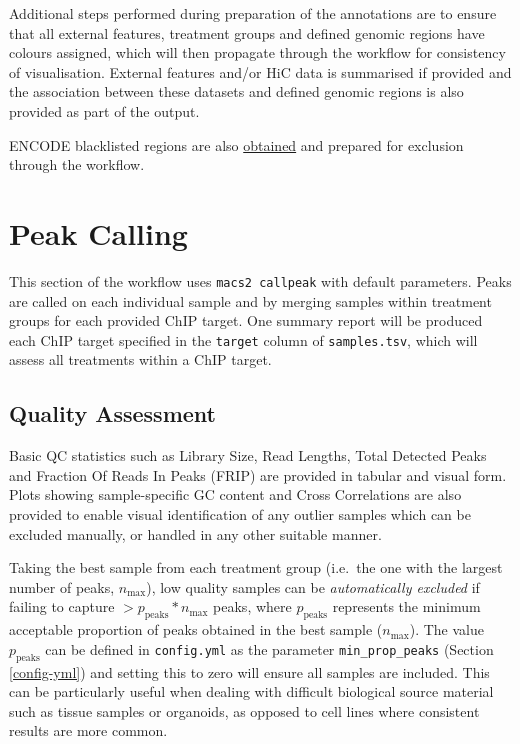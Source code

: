 \documentclass[
]{book}
\begin{document}
Additional steps performed during preparation of the annotations are to ensure that all external features, treatment groups and defined genomic regions have colours assigned, which will then propagate through the workflow for consistency of visualisation.
External features and/or HiC data is summarised if provided and the association between these datasets and defined genomic regions is also provided as part of the output.

ENCODE blacklisted regions are also \href{https://github.com/Boyle-Lab/Blacklist}{obtained} and prepared for exclusion through the workflow.

\hypertarget{peak-calling}{%
\section{Peak Calling}\label{peak-calling}}

This section of the workflow uses \texttt{macs2\ callpeak}\citep{macs2} with default parameters.
Peaks are called on each individual sample and by merging samples within treatment groups for each provided ChIP target.
One summary report will be produced each ChIP target specified in the \texttt{target} column of \texttt{samples.tsv}, which will assess all treatments within a ChIP target.

\hypertarget{quality-assessment}{%
\subsection*{Quality Assessment}\label{quality-assessment}}

Basic QC statistics such as Library Size, Read Lengths, Total Detected Peaks and Fraction Of Reads In Peaks (FRIP) are provided in tabular and visual form.
Plots showing sample-specific GC content and Cross Correlations are also provided to enable visual identification of any outlier samples which can be excluded manually, or handled in any other suitable manner.

Taking the best sample from each treatment group (i.e.~the one with the largest number of peaks, \(n_\text{max}\)), low quality samples can be \emph{automatically excluded} if failing to capture \(> p_\text{peaks} * n_\text{max}\) peaks, where \(p_\text{peaks}\) represents the minimum acceptable proportion of peaks obtained in the best sample (\(n_\text{max}\)).
The value \(p_\text{peaks}\) can be defined in \texttt{config.yml} as the parameter \texttt{min\_prop\_peaks} (Section \ref{config-yml}) and setting this to zero will ensure all samples are included.
This can be particularly useful when dealing with difficult biological source material such as tissue samples or organoids, as opposed to cell lines where consistent results are more common.
\end{document}
